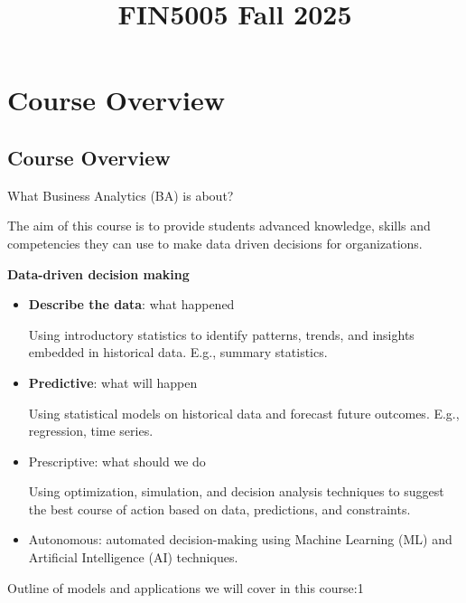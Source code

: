 \documentclass[
  12pt,
  letterpaper,
]{scrbook}
\title{FIN5005 Fall 2025}
\author{}
\date{}
\renewcommand*\contentsname{Table of contents}
\newcommand\contentsname{Table of contents}
\theoremstyle{plain}
\theoremstyle{definition}
\theoremstyle{remark}
\begin{document}
\frontmatter
\maketitle

\renewcommand*\contentsname{Table of contents}
{
\setcounter{tocdepth}{2}
\tableofcontents
}

\mainmatter
\chapter{Course Overview}\label{course-overview}

\section{Course Overview}\label{course-overview-1}

What Business Analytics (BA) is about?

The aim of this course is to provide students advanced knowledge, skills
and competencies they can use to make data driven decisions for
organizations.

\textbf{Data-driven decision making}

\begin{itemize}
\item
  \textbf{Describe the data}: what happened

  Using introductory statistics to identify patterns, trends, and
  insights embedded in historical data. E.g., summary statistics.
\item
  \textbf{Predictive}: what will happen

  Using statistical models on historical data and forecast future
  outcomes. E.g., regression, time series.
\item
  Prescriptive: what should we do

  Using optimization, simulation, and decision analysis techniques to
  suggest the best course of action based on data, predictions, and
  constraints.
\item
  Autonomous: automated decision-making using Machine Learning (ML) and
  Artificial Intelligence (AI) techniques.
\end{itemize}

Outline of models and applications we will cover in this course:1
\end{document}

